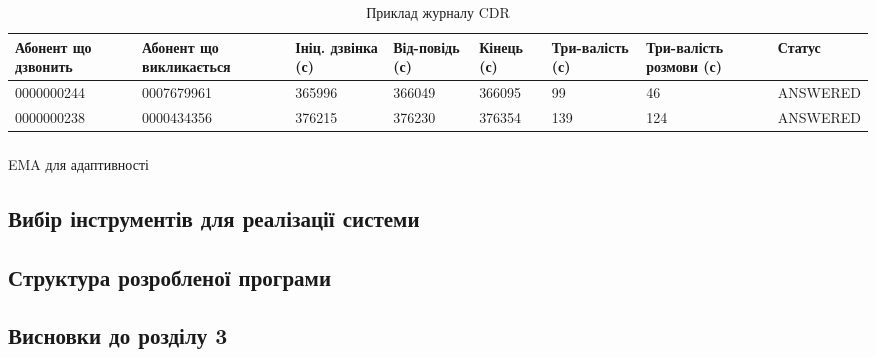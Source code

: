   \begin{table}[h]
  \footnotesize
  \caption{Приклад журналу CDR}
        \begin{tabularx}{\textwidth}{| X | X | X | X | X | X | X | X |}
          \hline
          Абонент що дзвонить & Абонент що викликається & Ініц. дзвінка (с) & Від-повідь (с) & Кінець (с) & Три-валість (с) & Три-валість розмови (с) & Статус \\ \hline
          \scriptsize{0000000244} & \scriptsize{0007679961} & 365996 & 366049 & 366095 & 99 & 46 & \scriptsize{ANSWERED} \\ \hline
          \scriptsize{0000000238} & \scriptsize{0000434356} & 376215 & 376230 & 376354 & 139 & 124 & \scriptsize{ANSWERED}  \\ \hline
      \end{tabularx}
      \label{tab:cdr-log-example}
  \end{table}

\subsubsection{\TBD}

EMA для адаптивності


\subsection{Вибір інструментів для реалізації системи}
    \TBD

\subsection{Структура розробленої програми}
    \TBD


\newpage
\subsection*{Висновки до розділу 3}
    \TBD
